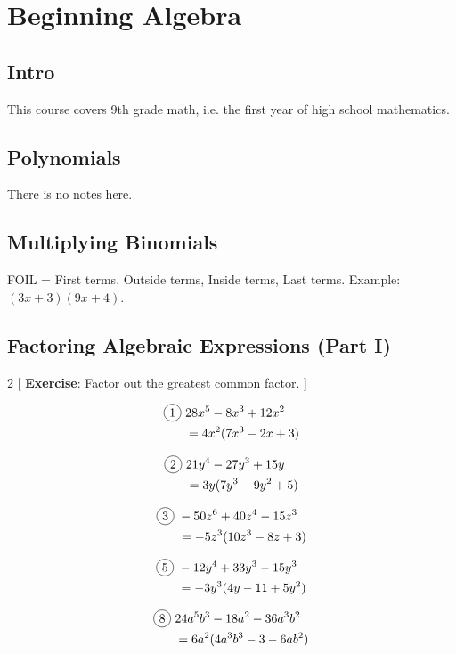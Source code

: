 \chapter{Beginning Algebra}

\section{Intro}

This course covers 9th grade math, i.e. the first year of high school mathematics.

\section{Polynomials}

There is no notes here.

\section{Multiplying Binomials}

FOIL = First terms, Outside terms, Inside terms, Last terms. Example: $(3x+3)(9x+4)$.

\section{Factoring Algebraic Expressions (Part I)}

\begin{multicols}{2}
[
  \textbf{Exercise}: Factor out the greatest common factor.
]

\begin{align*}
  \circled{1}\ &28x^{5}-8x^{3}+12x^{2}\\
  &=4x^{2}(7x^{3}-2x+3)
\end{align*}

\begin{align*}
  \circled{2}\ &21y^{4}-27y^{3}+15y\\
  &=3y(7y^{3}-9y^{2}+5)
\end{align*}

\begin{align*}
  \circled{3}\ &-50z^{6}+40z^{4}-15z^{3}\\
  &=-5z^{3}(10z^{3}-8z+3)
\end{align*}

\begin{align*}
  \circled{5}\ &-12y^{4}+33y^{3}-15y^{3}\\
  &=-3y^{3}(4y-11+5y^{2})
\end{align*}

\begin{align*}
  \circled{8}\ &24a^{5}b^{3}-18a^{2}-36a^{3}b^{2}\\
  &=6a^{2}(4a^{3}b^{3}-3-6ab^{2})
\end{align*}

\end{multicols}

